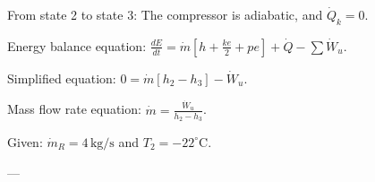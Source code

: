 From state 2 to state 3:  
The compressor is adiabatic, and \( \dot{Q}_k = 0 \).  

Energy balance equation:  
\( \frac{dE}{dt} = \dot{m} \left[ h + \frac{k e}{2} + p e \right] + \dot{Q} - \sum \dot{W}_u \).  

Simplified equation:  
\( 0 = \dot{m} \left[ h_2 - h_3 \right] - \dot{W}_u \).  

Mass flow rate equation:  
\( \dot{m} = \frac{\dot{W}_u}{h_2 - h_3} \).  

Given:  
\( \dot{m}_R = 4 \, \text{kg/s} \) and \( T_2 = -22^\circ \text{C} \).  

---